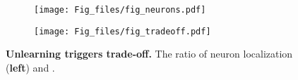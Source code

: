 \begin{figure}[!h]
\vspace{-.2cm}
\hspace{+.6cm}
\begin{subfigure}[t]{0.45\textwidth}
    \centering
    \texttt{[image: Fig\_files/fig\_neurons.pdf]}
\end{subfigure}
\begin{subfigure}[t]{0.45\textwidth}
    \centering
    \texttt{[image: Fig\_files/fig\_tradeoff.pdf]}
\end{subfigure}
\vspace{-.3cm}
\caption{\textbf{Unlearning triggers trade-off.} The ratio of neuron localization (\textbf{left}) and .}
\vspace{-.3cm}
\label{fig:tradeoff_hyperneuron}
\end{figure}
